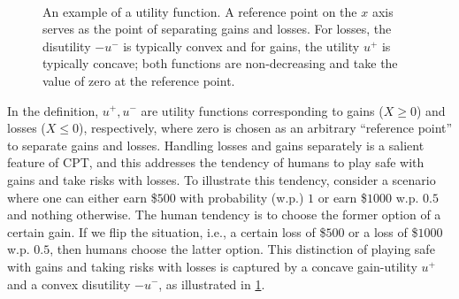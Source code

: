 \begin{figure}[t]
{{}}\\[1ex]
\caption{An example of a utility function. A reference point on the $x$ axis serves as the point of separating gains and losses.
For losses, the disutility $-u^-$ is typically convex and for gains, the utility $u^+$ is typically concave; 
both functions are non-decreasing and take the value of zero at the reference point.}
\label{fig:u}
\end{figure}



In the definition, $u^+, u^-$ are utility functions corresponding to gains ($X \ge 0$) and losses ($X \le 0$), respectively,
where zero is chosen as an arbitrary ``reference point'' to separate gains and losses.
Handling losses and gains separately is a salient feature of CPT, and this addresses the tendency of humans to play safe with gains and take risks with losses. %
To illustrate this tendency, 
consider a scenario where one can either earn \$$500$ with probability (w.p.) $1$ or earn \$$1000$ w.p. $0.5$ and nothing otherwise. 
The human tendency is to choose the former option of a certain gain. 
If we flip the situation, i.e., a certain loss of \$$500$ or a loss of \$$1000$ w.p. $0.5$, 
then humans choose the latter option.  
This distinction of playing safe with gains and taking risks with losses is captured by a concave gain-utility
$u^+$ and a convex disutility $-u^-$, as illustrated in \cref{fig:u}.

